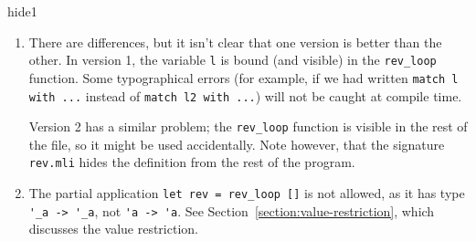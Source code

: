 \begin{exercise}{hide1}
\begin{answer}\ifanswers
\begin{enumerate}
\item

There are differences, but it isn't clear that one version is better
than the other.  In version 1, the variable \hbox{\lstinline+l+} is
bound (and visible) in the \hbox{\lstinline+rev_loop+} function.  Some
typographical errors (for example, if we had
written \hbox{\lstinline+match l with ...+} instead
of \hbox{\lstinline+match l2 with ...+}) will not be caught at compile
time.

Version 2 has a similar problem; the \hbox{\lstinline+rev_loop+}
function is visible in the rest of the file, so it might be used
accidentally.  Note however, that the
signature \hbox{\lstinline+rev.mli+} hides the definition from the
rest of the program.

\item

The partial application \hbox{\lstinline+let rev = rev_loop []+} is
not allowed, as it has type \hbox{\lstinline+'_a -> '_a+},
not \hbox{\lstinline+'a -> 'a+}.  See
Section~\ref{section:value-restriction}, which discusses the value
restriction.

\end{enumerate}
\fi\end{answer}
\end{exercise}

